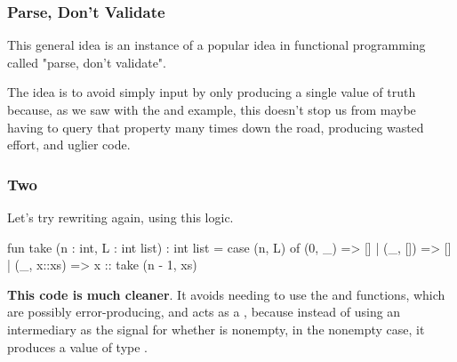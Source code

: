 \documentclass[aspectratio=169]{beamer}
\begin{document}
\begin{frame}[fragile]
  \frametitle{Parse, Don't Validate}

  This general idea is an instance of a popular idea in functional programming
  called "parse, don't validate".

  \pause
  \vspace{\fill}


  \pause
  \vspace{\fill}

  The idea is to avoid simply  input by only producing a single
  value of truth because, as we saw with the  and 
  example, this doesn't stop us from maybe having to query that property many times
  down the road, producing wasted effort, and uglier code.

  \pause
  \vspace{\fill}

\end{frame}

\begin{frame}[fragile]
  \frametitle{ Two}

  Let's try rewriting  again, using this logic.

  \pause
  \begin{codeblock}
    fun take (n : int, L : int list) : int list =
      case (n, L) of
        (0, _)     => []
      | (_, [])    => []
      | (_, x::xs) => x :: take (n - 1, xs)
  \end{codeblock}

  \pause
  \vspace{\fill}

  \textbf{This code is much cleaner}. It avoids needing to use the  and
   functions, which are possibly error-producing, and acts as a
  , because instead of using an intermediary  as the
  signal for whether  is nonempty, in the nonempty case, it produces
  a value of type .
\end{frame}
\end{document}
